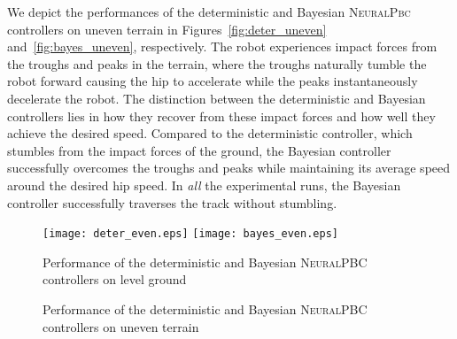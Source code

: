 We depict the performances of the deterministic and Bayesian \textsc{NeuralPbc}
controllers on uneven terrain in Figures~\ref{fig:deter_uneven}
and~\ref{fig:bayes_uneven}, respectively.
%
The robot experiences impact forces from the troughs and peaks in the terrain,
where the troughs naturally tumble the robot forward causing the hip to accelerate
while the peaks instantaneously decelerate the robot.  
%
The distinction between the deterministic and Bayesian controllers lies in how
they recover from these impact forces and how well they achieve the desired
speed.
%
Compared to the deterministic controller, which stumbles from the impact
forces of the ground, the Bayesian controller successfully overcomes the troughs
and peaks while maintaining its average speed around the desired hip speed.
%
In \textit{all} the experimental runs, the Bayesian controller successfully
traverses the track without stumbling. 
%
\begin{figure}[tb]
    \centering
    \texttt{[image: deter\_even.eps]}\hfill
    \texttt{[image: bayes\_even.eps]}
    \caption{Performance of the deterministic and Bayesian \textsc{NeuralPBC} controllers on level ground}
    \label{fig:deter_vs_bayes_hardware_even}
\end{figure}
%
\begin{figure}[tb]
    \centering
    \begin{minipage}{0.47\linewidth}
    \end{minipage}\hfill
    \begin{minipage}{0.47\linewidth}
    \end{minipage}
    \caption{Performance of the deterministic and Bayesian \textsc{NeuralPBC} controllers on uneven terrain}
    \label{fig:deter_vs_bayes_hardware_UNeven}
\end{figure}

